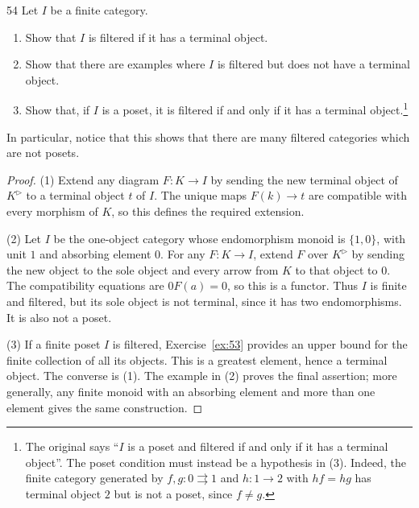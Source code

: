 \begin{exercise}{54}
Let $I$ be a finite category.
\begin{enumerate}[label=(\arabic*)]
\item Show that $I$ is filtered if it has a terminal object.
\item Show that there are examples where $I$ is filtered but does not have a terminal object.
\item Show that, if $I$ is a poset, it is filtered if and only if it has a terminal object.\footnote{The original says ``$I$ is a poset and filtered if and only if it has a terminal object''. The poset condition must instead be a hypothesis in (3). Indeed, the finite category generated by $f,g\colon0\rightrightarrows1$ and $h\colon1\to2$ with $hf=hg$ has terminal object $2$ but is not a poset, since $f\ne g$.}
\end{enumerate}
In particular, notice that this shows that there are many filtered categories which are not
posets.

\begin{proof}
(1) Extend any diagram $F\colon K\to I$ by sending the
new terminal object of $K^{\rhd}$ to a terminal object $t$ of $I$.
The unique maps $F(k)\to t$ are compatible with every morphism
of $K$, so this defines the required extension.

(2) Let $I$ be the one-object category whose endomorphism
monoid is $\{1,0\}$, with unit $1$ and absorbing element $0$.
For any $F\colon K\to I$, extend $F$ over $K^{\rhd}$ by
sending the new object to the sole object and every arrow
from $K$ to that object to $0$.
The compatibility equations are $0F(a)=0$, so this is a functor.
Thus $I$ is finite and filtered, but its sole object is not
terminal, since it has two endomorphisms.
It is also not a poset.

(3) If a finite poset $I$ is filtered, Exercise~\ref{ex:53}
provides an upper bound for the finite collection of all its
objects. This is a greatest element, hence a terminal object.
The converse is (1).
The example in (2) proves the final assertion; more generally,
any finite monoid with an absorbing element and more than one
element gives the same construction.
\end{proof}
\end{exercise}
